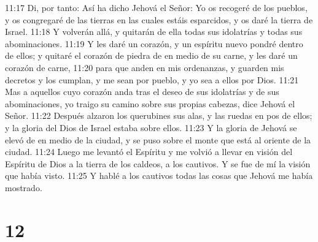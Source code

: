 11:17 Di, por tanto: Así ha dicho Jehová el Señor: Yo os recogeré de los pueblos, y os congregaré de las tierras en las cuales estáis esparcidos, y os daré la tierra de Israel.  
11:18 Y volverán allá, y quitarán de ella todas sus idolatrías y todas sus abominaciones.  
11:19 Y les daré un corazón, y un espíritu nuevo pondré dentro de ellos; y quitaré el corazón de piedra de en medio de su carne, y les daré un corazón de carne,  
11:20 para que anden en mis ordenanzas, y guarden mis decretos y los cumplan, y me sean por pueblo, y yo sea a ellos por Dios. 
11:21 Mas a aquellos cuyo corazón anda tras el deseo de sus idolatrías y de sus abominaciones, yo traigo su camino sobre sus propias cabezas, dice Jehová el Señor.  
11:22 Después alzaron los querubines sus alas, y las ruedas en pos de ellos; y la gloria del Dios de Israel estaba sobre ellos.  
11:23 Y la gloria de Jehová se elevó de en medio de la ciudad, y se puso sobre el monte que está al oriente de la ciudad. 
11:24 Luego me levantó el Espíritu y me volvió a llevar en visión del Espíritu de Dios a la tierra de los caldeos, a los cautivos. Y se fue de mí la visión que había visto.  
11:25 Y hablé a los cautivos todas las cosas que Jehová me había mostrado.  

\chapter{12}

